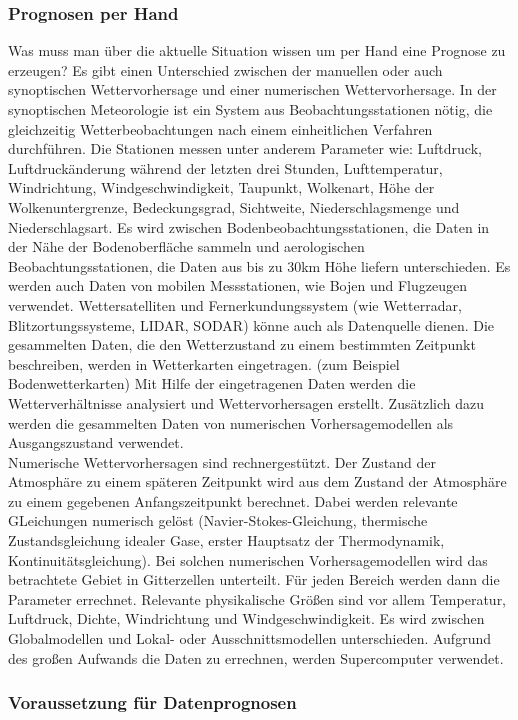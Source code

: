 \documentclass[a4paper,oneside,10pt,titlepage]{article}
\begin{document}
\subsubsection{Prognosen per Hand}
Was muss man über die aktuelle Situation wissen um per Hand eine Prognose zu erzeugen?
Es gibt einen Unterschied zwischen der manuellen oder auch synoptischen Wettervorhersage und einer numerischen Wettervorhersage. In der synoptischen Meteorologie ist ein System aus Beobachtungsstationen nötig, die gleichzeitig Wetterbeobachtungen nach einem einheitlichen Verfahren durchführen. Die Stationen messen unter anderem Parameter wie: Luftdruck, Luftdruckänderung während der letzten drei Stunden, Lufttemperatur, Windrichtung, Windgeschwindigkeit, Taupunkt, Wolkenart, Höhe der Wolkenuntergrenze, Bedeckungsgrad, Sichtweite, Niederschlagsmenge und Niederschlagsart. Es wird zwischen Bodenbeobachtungsstationen, die Daten in der Nähe der Bodenoberfläche sammeln und aerologischen Beobachtungsstationen, die Daten aus bis zu 30km Höhe liefern unterschieden. Es werden auch Daten von mobilen Messstationen, wie Bojen und Flugzeugen verwendet. Wettersatelliten und Fernerkundungssystem (wie Wetterradar, Blitzortungssysteme, LIDAR, SODAR) könne auch als Datenquelle dienen. Die gesammelten Daten, die den Wetterzustand zu einem bestimmten Zeitpunkt beschreiben, werden in Wetterkarten eingetragen. (zum Beispiel Bodenwetterkarten) Mit Hilfe der eingetragenen Daten werden die Wetterverhältnisse analysiert und Wettervorhersagen erstellt. Zusätzlich dazu werden die gesammelten Daten von numerischen Vorhersagemodellen als Ausgangszustand verwendet. %
\\
Numerische Wettervorhersagen sind rechnergestützt. Der Zustand der Atmosphäre zu einem späteren Zeitpunkt wird aus dem Zustand der Atmosphäre zu einem gegebenen Anfangszeitpunkt berechnet. Dabei werden relevante GLeichungen numerisch gelöst (Navier-Stokes-Gleichung, thermische Zustandsgleichung idealer Gase, erster Hauptsatz der Thermodynamik, Kontinuitätsgleichung). Bei solchen numerischen Vorhersagemodellen wird das betrachtete Gebiet in Gitterzellen unterteilt. Für jeden Bereich werden dann die Parameter errechnet. Relevante physikalische Größen sind vor allem Temperatur, Luftdruck, Dichte, Windrichtung und Windgeschwindigkeit. Es wird zwischen Globalmodellen und Lokal- oder Ausschnittsmodellen unterschieden. Aufgrund des großen Aufwands die Daten zu errechnen, werden Supercomputer verwendet.
\subsubsection{Voraussetzung für Datenprognosen}
\end{document}

